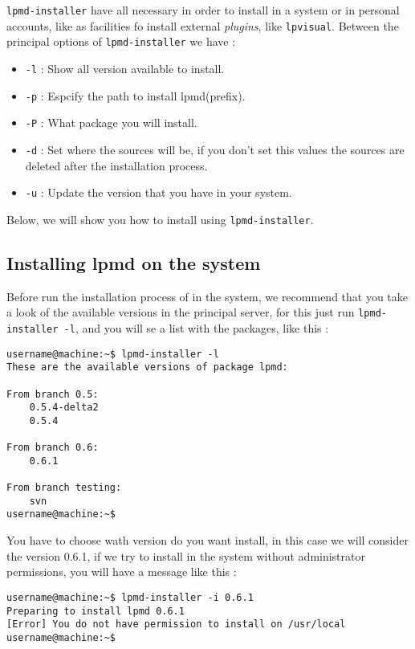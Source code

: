 \verb|lpmd-installer| have all necessary in order to install {\lpmd} in a
system or in personal accounts, like as facilities fo install external
\textit{plugins}, like \verb|lpvisual|. Between the principal options of
\verb|lpmd-installer| we have :

\begin{itemize}
 \item \verb|-l| : Show all version available to install.
 \item \verb|-p| : Espcify the path to install lpmd(prefix).
 \item \verb|-P| : What package you will install.
 \item \verb|-d| : Set where the sources will be, if you don't set this values
the sources are deleted after the installation process.
 \item \verb|-u| : Update the {\lpmd} version that you have in your system.
\end{itemize}

Below, we will show you how to install {\lpmd} using \verb|lpmd-installer|.

\subsection{Installing lpmd on the system}

Before run the installation process of {\lpmd} in the system, we recommend that
you take a look of the available versions in the principal server, for this
just run \verb|lpmd-installer -l|, and you will se a list with the packages,
like this :

\begin{verbatim}
username@machine:~$ lpmd-installer -l
These are the available versions of package lpmd:

From branch 0.5: 
    0.5.4-delta2
    0.5.4

From branch 0.6: 
    0.6.1

From branch testing: 
    svn
username@machine:~$
\end{verbatim}

You have to choose wath version do you want install, in this case we will
consider the version 0.6.1, if we try to install in the system without
administrator permissions, you will have a message like this :

\begin{verbatim}
username@machine:~$ lpmd-installer -i 0.6.1
Preparing to install lpmd 0.6.1
[Error] You do not have permission to install on /usr/local
username@machine:~$
\end{verbatim}

